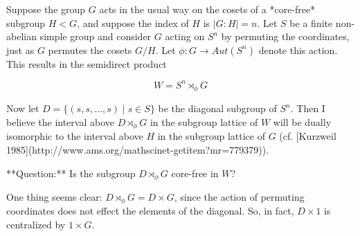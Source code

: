 Suppose the group $G$ acts in the usual way on the cosets of a *core-free* subgroup $H< G$, and suppose the index of $H$ is $|G:H|=n$.  Let $S$ be a finite non-abelian simple group and consider $G$ acting on $S^n$ by permuting the coordinates, just as $G$ permutes the cosets $G/H$.  Let $\phi: G \rightarrow Aut(S^n)$ denote this action.  This results in the semidirect product

$$ W = S^n \rtimes_\phi G$$

Now let $D = \{(s,s,\dots, s) \mid s\in S\}$ be the diagonal subgroup of $S^n$.  Then I believe the interval above $D\rtimes_\phi G$ in the subgroup lattice of $W$ will be dually isomorphic to the interval above $H$ in the subgroup lattice of $G$  (cf. [Kurzweil 1985](http://www.ams.org/mathscinet-getitem?mr=779379)).

**Question:** Is the subgroup $D\rtimes_\phi G$ core-free in $W$?

One thing seems clear: $D\rtimes_\phi G = D\times G$, since the action of permuting coordinates does not effect the elements of the diagonal.  So, in fact, $D\times 1$ is centralized by $1\times G$.
